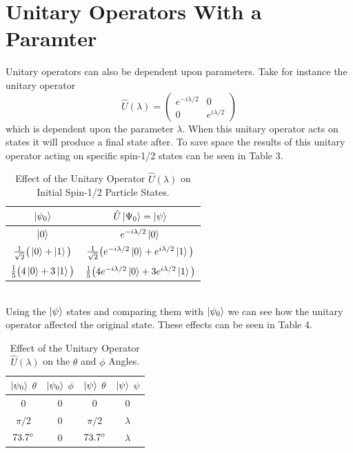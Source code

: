 \documentclass[twocolumn]{article}
\begin{document}
\section*{Unitary Operators With a Paramter}
Unitary operators can also be dependent upon parameters. Take for instance the unitary operator
\begin{equation}
\hat{U}(\lambda)=
\begin{pmatrix}
e^{-i\lambda/2} & 0 \\
0 & e^{i\lambda/2}
\end{pmatrix}
\end{equation}
which is dependent upon the parameter $\lambda$. When this unitary operator acts on states it will produce a final state after. To save space the results of this unitary operator acting on specific spin-1/2 states can be seen in Table 3.
\begin{table}[h!]
\begin{center}
\begin{tabular}{ |c|c| }
\hline $\ket{\psi_0}$& $\hat{U}\ket{\Psi_0}=\ket{\psi}$ \\
\hline $\ket{0}$& $e^{-i\lambda/2}\ket{0}$\\
\hline $\frac{1}{\sqrt{2}}\big(\ket{0}+\ket{1}\big)$& $\frac{1}{\sqrt{2}}\big(e^{-i\lambda/2}\ket{0}+e^{i\lambda/2}\ket{1}\big)$\\
\hline $\frac{1}{5}\big(4\ket{0}+3\ket{1}\big)$& $\frac{1}{5}\big(4e^{-i\lambda/2}\ket{0}+3e^{i\lambda/2}\ket{1}\big)$\\
\hline
\end{tabular}
\caption{Effect of the Unitary Operator $\hat{U}(\lambda)$ on Initial Spin-1/2 Particle States.}
\end{center}
\end{table} \\
Using the $\ket{\psi}$ states and comparing them with $\ket{\psi_0}$ we can see how the unitary operator affected the original state. These effects can be seen in Table 4.
\newpage
\begin{table}[h!]
\begin{center}
\begin{tabular}{ |c|c|c|c| }
\hline $\ket{\psi_0}$ $\theta$& $\ket{\psi_0}$ $\phi$& $\ket{\psi}$ $\theta$& $\ket{\psi}$ $\psi$ \\
\hline 0 & 0 & 0 & 0 \\
\hline $\pi/2$ & 0 & $\pi/2$ & $\lambda$ \\
\hline $73.7\degree$ & $0$ & $73.7\degree$ & $\lambda$ \\
\hline
\end{tabular}
\caption{Effect of the Unitary Operator $\hat{U}(\lambda)$ on the $\theta$ and $\phi$ Angles.}
\end{center}
\end{table} 
\end{document}
